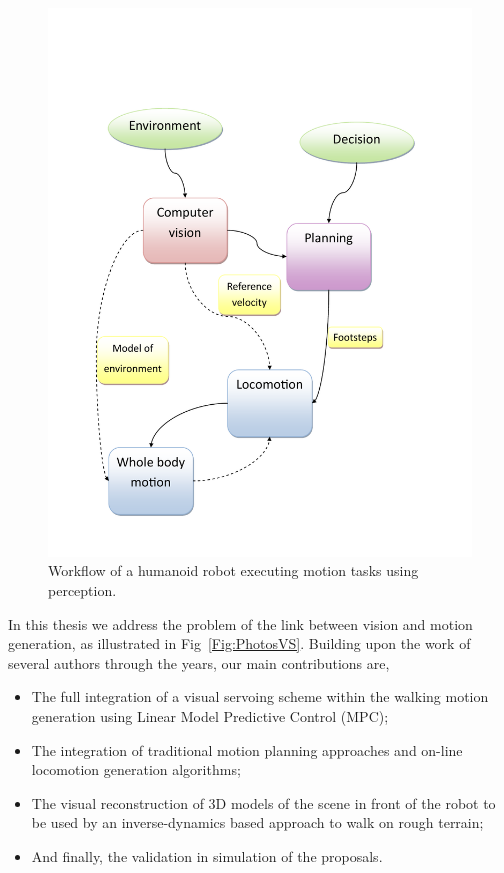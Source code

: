 \begin{figure}[h!]
\centering
\includegraphics[scale=0.5]{Chap1-Introduction/general-diagram.pdf}
\caption[]{ \label{Fig:GeneralDiagram} Workflow of a humanoid robot executing motion tasks using perception.}
\end{figure}

In this thesis we address the problem of the link between vision and motion generation, as illustrated in Fig~\ref{Fig:PhotosVS}. Building upon the work of several authors through the years, our main contributions are,

\begin{itemize}
\item The full integration of a visual servoing scheme within the walking motion generation using Linear Model Predictive Control (MPC);
\item The integration of traditional motion planning approaches and on-line locomotion generation algorithms;
\item The visual reconstruction of 3D models of the scene in front of the robot to be used by an inverse-dynamics based approach to walk on rough terrain;
\item And finally, the validation in simulation of the proposals.
\end{itemize}

